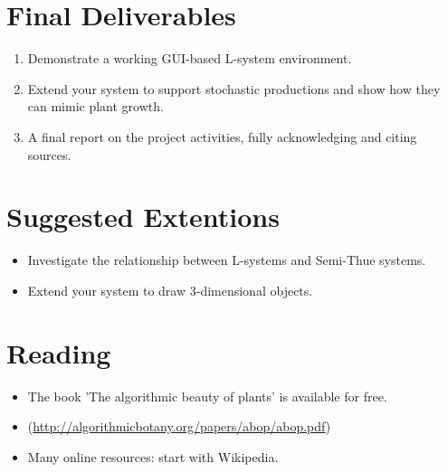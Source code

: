 \documentclass[11pt]{report}
\begin{document}
\section{Final Deliverables}
\begin{enumerate}
    \item Demonstrate a working GUI-based L-system environment.
    \item Extend your system to support stochastic productions and show how they can
          mimic plant growth.
    \item A final report on the project activities, fully acknowledging and citing
          sources.
\end{enumerate}

\section{Suggested Extentions}
\begin{itemize}
    \item Investigate the relationship between L-systems and Semi-Thue systems.
    \item Extend your system to draw 3-dimensional objects.
\end{itemize}

\section{Reading}
\begin{itemize}
    \item The book 'The algorithmic beauty of plants' is available for free.
    \item (\url{http://algorithmicbotany.org/papers/abop/abop.pdf})
    \item Many online resources: start with Wikipedia.
\end{itemize}

\cite{example-cite}

\clearpage
\printbibliography
\end{document}

